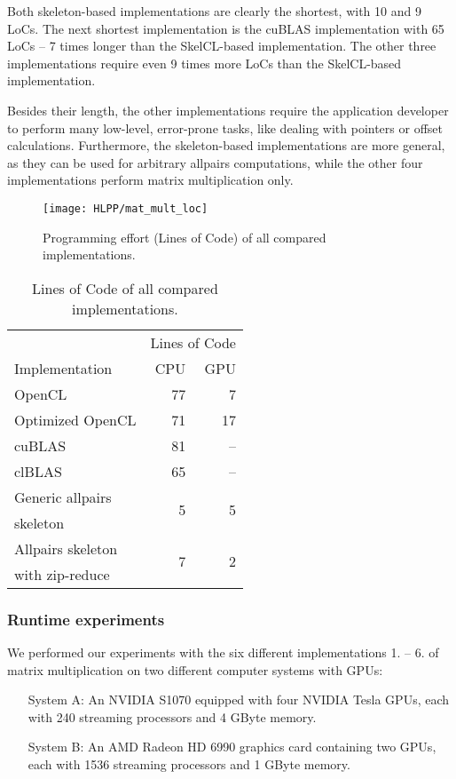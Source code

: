 Both skeleton-based implementations are clearly the shortest, with 10 and 9 LoCs.
The next shortest implementation is the cuBLAS implementation with 65 LoCs -- 7 times longer than the SkelCL-based implementation.
The other three implementations require even 9 times more LoCs than the SkelCL-based implementation.

Besides their length, the other implementations require the application developer to perform many low-level, error-prone tasks, like dealing with pointers or offset calculations.
Furthermore, the skeleton-based implementations are more general, as they can be used for arbitrary allpairs computations, while the other four implementations perform matrix multiplication only.
\vspace{4em}

\begin{figure}[t]
  \centering
  \texttt{[image: HLPP/mat\_mult\_loc]}
  \caption{Programming effort (Lines of Code) of all compared implementations.}
  \label{fig:mat_mult_loc}
\end{figure}
\begin{table}[b]
  \centering
  \begin{tabular}{lrr}
    \toprule
              & \multicolumn{2}{c}{Lines of Code} \\
    \cmidrule(r){2-3}
    Implementation & CPU & GPU \\
    \midrule
    OpenCL            & 77 &  7 \\
    Optimized OpenCL  & 71 & 17 \\
    cuBLAS            & 81 & -- \\
    clBLAS            & 65 & -- \\
    Generic allpairs  & \multirow{2}{*}{5} & \multirow{2}{*}{5}\\
    skeleton\\
    Allpairs skeleton & \multirow{2}{*}{7} & \multirow{2}{*}{2}\\
    with zip-reduce\\
    \bottomrule
  \end{tabular}
  \caption{Lines of Code of all compared implementations.}
  \label{tab:mat_mult_loc}
\end{table}

\subsubsection{Runtime experiments}
We performed our experiments with the six different implementations 1. -- 6. of matrix multiplication on two different computer systems with GPUs:
\begin{itemize}[leftmargin=50pt]
  \item[System A:] An NVIDIA S1070 equipped with four NVIDIA Tesla GPUs, each with 240 streaming processors and 4 GByte memory.
  \item[System B:] An AMD Radeon HD 6990 graphics card containing two GPUs, each with 1536 streaming processors and 1 GByte memory.
\end{itemize}

